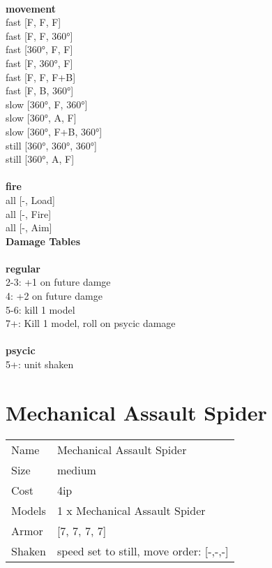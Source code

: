 \ \\ {\bf movement } \\
fast [F, F, F] \\
fast [F, F, 360°] \\
fast [360°, F, F] \\
fast [F, 360°, F] \\
fast [F, F, F+B] \\
fast [F, B, 360°] \\
slow [360°, F, 360°] \\
slow [360°, A, F] \\
slow [360°, F+B, 360°] \\
still [360°, 360°, 360°] \\
still [360°, A, F] \\
\ \\ {\bf fire } \\
all [-, Load] \\
all [-, Fire] \\
all [-, Aim] \\


{\bf Damage Tables} \\
\ \\ {\bf regular } \\
2-3: +1 on future damge \\
4: +2 on future damge \\
5-6: kill 1 model \\
7+: Kill 1 model, roll on psycic damage \\
\ \\ {\bf psycic } \\
5+: unit shaken \\










\pagebreak\pagebreak

\section{ Mechanical Assault Spider }

\begin{tabular}{ll}
  Name & Mechanical Assault Spider \\
  Size & medium\\
  Cost & 4ip\\
  Models & 1 x Mechanical Assault Spider\\
  Armor & [7, 7, 7, 7]\\
  Shaken & speed set to still, move order: [-,-,-]\\
\end{tabular}

